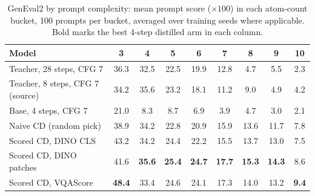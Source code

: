\documentclass[11pt,a4paper]{article}
\begin{document}
\begin{table}[ht]
\centering
\caption{GenEval2 by prompt complexity: mean prompt score ($\times 100$) in each atom-count bucket, 100 prompts per bucket, averaged over training seeds where applicable. Bold marks the best 4-step distilled arm in each column.}
\label{tab:geneval2_complexity}
\begin{tabular}{l cccccccc}
\toprule
Model & 3 & 4 & 5 & 6 & 7 & 8 & 9 & 10 \\
\midrule
Teacher, 28 steps, CFG 7 & 36.3 & 32.5 & 22.5 & 19.9 & 12.8 & 4.7 & 5.5 & 2.3 \\
Teacher, 8 steps, CFG 7 (source) & 34.2 & 35.6 & 23.2 & 18.1 & 11.2 & 9.0 & 4.9 & 4.2 \\
Base, 4 steps, CFG 7 & 21.0 & 8.3 & 8.7 & 6.9 & 3.9 & 4.7 & 3.0 & 2.1 \\
\midrule
Naive CD (random pick) & 38.9 & 34.2 & 22.8 & 20.9 & 15.9 & 13.6 & 11.7 & 7.8 \\
Scored CD, DINO CLS & 43.2 & 34.2 & 24.4 & 22.2 & 15.5 & 13.7 & 13.0 & 7.5 \\
Scored CD, DINO patches & 41.6 & \textbf{35.6} & \textbf{25.4} & \textbf{24.7} & \textbf{17.7} & \textbf{15.3} & \textbf{14.3} & 8.6 \\
Scored CD, VQAScore & \textbf{48.4} & 33.4 & 24.6 & 24.1 & 17.3 & 14.0 & 13.2 & \textbf{9.4} \\
\bottomrule
\end{tabular}
\end{table}
\end{document}
